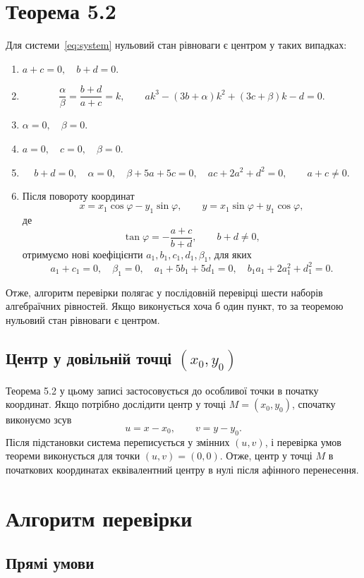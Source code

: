 \documentclass[12pt,a4paper]{article}
\begin{document}
\section{Теорема 5.2}

Для системи~\eqref{eq:system} нульовий стан рівноваги є центром у таких випадках:
\begin{enumerate}
    \item $a+c=0,\quad b+d=0$.
    \item
    \[
    \frac{\alpha}{\beta}=\frac{b+d}{a+c}=k,\qquad
    ak^3-(3b+\alpha)k^2+(3c+\beta)k-d=0.
    \]
    \item $\alpha=0,\quad \beta=0$.
    \item $a=0,\quad c=0,\quad \beta=0$.
    \item
    \[
    b+d=0,\quad \alpha=0,\quad \beta+5a+5c=0,\quad
    ac+2a^2+d^2=0,\qquad a+c\ne 0.
    \]
    \item Після повороту координат
    \[
    x=x_1\cos\varphi-y_1\sin\varphi,\qquad
    y=x_1\sin\varphi+y_1\cos\varphi,
    \]
    де
    \[
    \tan\varphi=-\frac{a+c}{b+d},\qquad b+d\ne 0,
    \]
    отримуємо нові коефіцієнти $a_1,b_1,c_1,d_1,\beta_1$, для яких
    \[
    a_1+c_1=0,\quad \beta_1=0,\quad
    a_1+5b_1+5d_1=0,\quad
    b_1a_1+2a_1^2+d_1^2=0.
    \]
\end{enumerate}

Отже, алгоритм перевірки полягає у послідовній перевірці шести наборів алгебраїчних рівностей. Якщо виконується хоча б один пункт, то за теоремою нульовий стан рівноваги є центром.

\subsection*{Центр у довільній точці $(x_0,y_0)$}

Теорема 5.2 у цьому записі застосовується до особливої точки в початку координат. Якщо потрібно дослідити центр у точці $M=(x_0,y_0)$, спочатку виконуємо зсув
\[
u=x-x_0,\qquad v=y-y_0.
\]
Після підстановки система переписується у змінних $(u,v)$, і перевірка умов теореми виконується для точки $(u,v)=(0,0)$. Отже, центр у точці $M$ в початкових координатах еквівалентний центру в нулі після афінного перенесення.

\section{Алгоритм перевірки}

\subsection{Прямі умови}
\end{document}
